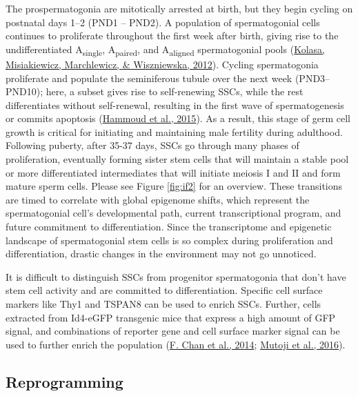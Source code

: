 \documentclass[12pt,twoside]{reedthesis}
\begin{document}
The prospermatogonia are mitotically arrested at birth, but they begin
cycling on postnatal days 1--2 (PND1 -- PND2). A population of
spermatogonial cells continues to proliferate throughout the first week
after birth, giving rise to the undifferentiated
A\textsubscript{single}, A\textsubscript{paired}, and
A\textsubscript{aligned} spermatogonial pools (\protect\hyperlink{ref-kolasa2012}{Kolasa, Misiakiewicz, Marchlewicz, \& Wiszniewska, 2012}). Cycling
spermatogonia proliferate and populate the seminiferous tubule over the
next week (PND3--PND10); here, a subset gives rise to self-renewing
SSCs, while the rest differentiates without self-renewal, resulting in
the first wave of spermatogenesis or commits apoptosis (\protect\hyperlink{ref-hammoud2015}{Hammoud et al., 2015}).
As a result, this stage of germ cell growth is critical for initiating
and maintaining male fertility during adulthood. Following puberty,
after 35-37 days, SSCs go through many phases of proliferation,
eventually forming sister stem cells that will maintain a stable pool or
more differentiated intermediates that will initiate meiosis I and II
and form mature sperm cells. Please see Figure \ref{fig:if2} for an
overview. These transitions are timed to correlate with global epigenome
shifts, which represent the spermatogonial cell's developmental path,
current transcriptional program, and future commitment to
differentiation. Since the transcriptome and epigenetic landscape of
spermatogonial stem cells is so complex during proliferation and
differentiation, drastic changes in the environment may not go
unnoticed.

It is difficult to distinguish SSCs from progenitor spermatogonia that
don't have stem cell activity and are committed to differentiation.
Specific cell surface markers like Thy1 and TSPAN8 can be used to enrich
SSCs. Further, cells extracted from Id4-eGFP transgenic mice that
express a high amount of GFP signal, and combinations of reporter gene
and cell surface marker signal can be used to further enrich the
population (\protect\hyperlink{ref-chan2014}{F. Chan et al., 2014}; \protect\hyperlink{ref-mutoji2016}{Mutoji et al., 2016}).

\hypertarget{section}{%
\subsection*{}\label{section}}

\hypertarget{reprogramming}{%
\subsection*{Reprogramming}\label{reprogramming}}
\end{document}
